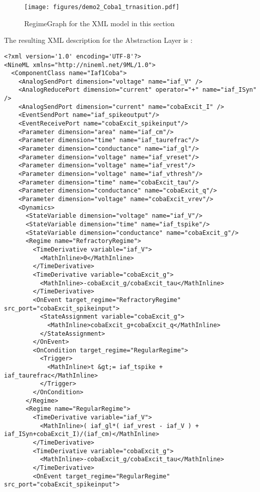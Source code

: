 \documentclass[draftspec]{ninemlspec}
\begin{document}
\begin{figure}[htb!]
\center
\texttt{[image: figures/demo2\_Coba1\_trnasition.pdf]}
\protect\caption{RegimeGraph for the XML model in this section}
\label{fig:EX2_trans}
\end{figure}
\clearpage
The resulting XML description for the Abstraction Layer is :
\begin{lstlisting}[label=code:xmliaf2]
<?xml version='1.0' encoding='UTF-8'?>
<NineML xmlns="http://nineml.net/9ML/1.0">
  <ComponentClass name="Iaf1Coba">
    <AnalogSendPort dimension="voltage" name="iaf_V" />
    <AnalogReducePort dimension="current" operator="+" name="iaf_ISyn" />
    <AnalogSendPort dimension="current" name="cobaExcit_I" />
    <EventSendPort name="iaf_spikeoutput"/>
    <EventReceivePort name="cobaExcit_spikeinput"/>
    <Parameter dimension="area" name="iaf_cm"/>
    <Parameter dimension="time" name="iaf_taurefrac"/>
    <Parameter dimension="conductance" name="iaf_gl"/>
    <Parameter dimension="voltage" name="iaf_vreset"/>
    <Parameter dimension="voltage" name="iaf_vrest"/>
    <Parameter dimension="voltage" name="iaf_vthresh"/>
    <Parameter dimension="time" name="cobaExcit_tau"/>
    <Parameter dimension="conductance" name="cobaExcit_q"/>
    <Parameter dimension="voltage" name="cobaExcit_vrev"/>
    <Dynamics>
      <StateVariable dimension="voltage" name="iaf_V"/>
      <StateVariable dimension="time" name="iaf_tspike"/>
      <StateVariable dimension="conductance" name="cobaExcit_g"/>
      <Regime name="RefractoryRegime">
        <TimeDerivative variable="iaf_V">
          <MathInline>0</MathInline>
        </TimeDerivative>
        <TimeDerivative variable="cobaExcit_g">
          <MathInline>-cobaExcit_g/cobaExcit_tau</MathInline>
        </TimeDerivative>
        <OnEvent target_regime="RefractoryRegime" src_port="cobaExcit_spikeinput">
          <StateAssignment variable="cobaExcit_g">
            <MathInline>cobaExcit_g+cobaExcit_q</MathInline>
          </StateAssignment>
        </OnEvent>
        <OnCondition target_regime="RegularRegime">
          <Trigger>
            <MathInline>t &gt;= iaf_tspike + iaf_taurefrac</MathInline>
          </Trigger>
        </OnCondition>
      </Regime>
      <Regime name="RegularRegime">
        <TimeDerivative variable="iaf_V">
          <MathInline>( iaf_gl*( iaf_vrest - iaf_V ) + iaf_ISyn+cobaExcit_I)/(iaf_cm)</MathInline>
        </TimeDerivative>
        <TimeDerivative variable="cobaExcit_g">
          <MathInline>-cobaExcit_g/cobaExcit_tau</MathInline>
        </TimeDerivative>
        <OnEvent target_regime="RegularRegime" src_port="cobaExcit_spikeinput">

\end{lstlisting}
\end{document}
